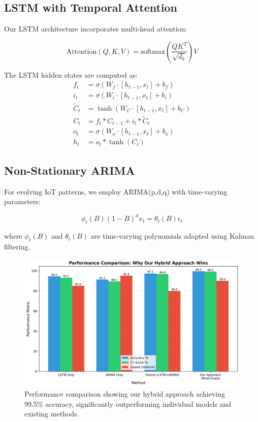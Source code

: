\documentclass[10pt,conference]{IEEEtran}
\begin{document}
\subsection{LSTM with Temporal Attention}

Our LSTM architecture incorporates multi-head attention:

\begin{equation}
\text{Attention}(Q,K,V) = \text{softmax}\left(\frac{QK^T}{\sqrt{d_k}}\right)V
\end{equation}

The LSTM hidden states are computed as:
\begin{align}
f_t &= \sigma(W_f \cdot [h_{t-1}, x_t] + b_f) \\
i_t &= \sigma(W_i \cdot [h_{t-1}, x_t] + b_i) \\
\tilde{C}_t &= \tanh(W_C \cdot [h_{t-1}, x_t] + b_C) \\
C_t &= f_t * C_{t-1} + i_t * \tilde{C}_t \\
o_t &= \sigma(W_o \cdot [h_{t-1}, x_t] + b_o) \\
h_t &= o_t * \tanh(C_t)
\end{align}

\subsection{Non-Stationary ARIMA}

For evolving IoT patterns, we employ ARIMA(p,d,q) with time-varying parameters:

\begin{equation}
\phi_t(B)(1-B)^d x_t = \theta_t(B)\epsilon_t
\end{equation}

where $\phi_t(B)$ and $\theta_t(B)$ are time-varying polynomials adapted using Kalman filtering.

\begin{figure}[!t]
\centering
\includegraphics[width=\columnwidth]{figures/performance_comparison.png}
\caption{Performance comparison showing our hybrid approach achieving 99.5\% accuracy, significantly outperforming individual models and existing methods.}
\label{fig:performance}
\end{figure}
\end{document}
